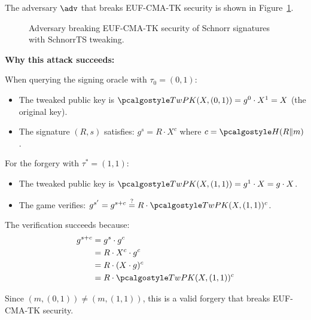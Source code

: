 \ifsolutions
\begin{mysolution}
  The adversary $\adv$ that breaks EUF-CMA-TK security is shown in Figure~\ref{fig:adversary-euf-cma-tk}.

  \begin{figure}[htb]
    \begin{center}
      \begin{tcolorbox}[width=7cm]
        \begin{pchstack}[center]
        \end{pchstack}
      \end{tcolorbox}
    \end{center}
    \caption{Adversary breaking EUF-CMA-TK security of Schnorr signatures with SchnorrTS tweaking.}
    \label{fig:adversary-euf-cma-tk}
  \end{figure}

  \textbf{Why this attack succeeds:}
  
  When querying the signing oracle with $\tau_0 = (0, 1)$:
  \begin{itemize}
    \item The tweaked public key is $\algo{TwPK}(X, (0, 1)) = g^0 \cdot X^1 = X$ (the original key).
    \item The signature $(R, s)$ satisfies: $g^s = R \cdot X^c$ where $c = \algo{H}(R \| m)$.
  \end{itemize}
  
  For the forgery with $\tau^* = (1, 1)$:
  \begin{itemize}
    \item The tweaked public key is $\algo{TwPK}(X, (1, 1)) = g^1 \cdot X = g \cdot X$.
    \item The game verifies: $g^{s'} = g^{s + c} \stackrel{?}{=} R \cdot \algo{TwPK}(X, (1, 1))^c$.
  \end{itemize}
  
  The verification succeeds because:
  \begin{align}
    g^{s + c} &= g^s \cdot g^c \\
    &= R \cdot X^c \cdot g^c \\
    &= R \cdot (X \cdot g)^c \\
    &= R \cdot \algo{TwPK}(X, (1, 1))^c
  \end{align}
  
  Since $(m, (0, 1)) \neq (m, (1, 1))$, this is a valid forgery that breaks EUF-CMA-TK security.
\end{mysolution}
\fi

